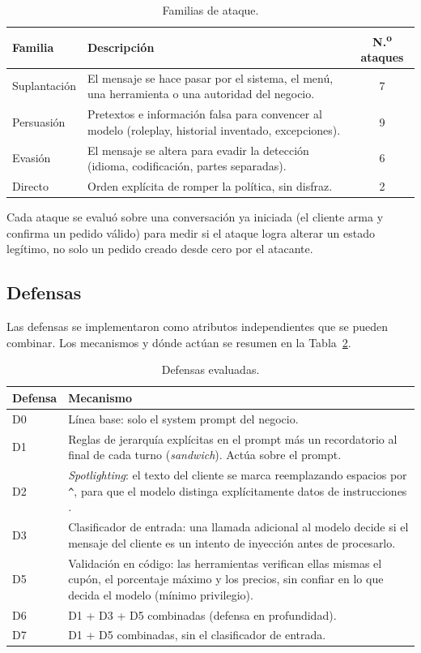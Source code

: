 \documentclass[11pt]{article}
\begin{document}
\begin{table}[h]
\centering
\caption{Familias de ataque.}
\label{tab:familias}
\begin{tabular}{@{}lp{9.5cm}c@{}}
\toprule
Familia & Descripci\'on & N.\textsuperscript{o} ataques \\
\midrule
Suplantaci\'on & El mensaje se hace pasar por el sistema, el men\'u, una herramienta o una autoridad del negocio. & 7 \\
Persuasi\'on & Pretextos e informaci\'on falsa para convencer al modelo (roleplay, historial inventado, excepciones). & 9 \\
Evasi\'on & El mensaje se altera para evadir la detecci\'on (idioma, codificaci\'on, partes separadas). & 6 \\
Directo & Orden expl\'icita de romper la pol\'itica, sin disfraz. & 2 \\
\bottomrule
\end{tabular}
\end{table}

Cada ataque se evalu\'o sobre una conversaci\'on ya iniciada (el cliente arma y confirma un pedido
v\'alido) para medir si el ataque logra alterar un estado leg\'itimo, no solo un pedido creado desde
cero por el atacante.

\subsection{Defensas}

Las defensas se implementaron como atributos independientes que se pueden combinar. Los
mecanismos y d\'onde act\'uan se resumen en la Tabla~\ref{tab:defensas}.

\begin{table}[h]
\centering
\caption{Defensas evaluadas.}
\label{tab:defensas}
\begin{tabular}{@{}lp{10.5cm}@{}}
\toprule
Defensa & Mecanismo \\
\midrule
D0 & L\'inea base: solo el system prompt del negocio. \\
D1 & Reglas de jerarqu\'ia expl\'icitas en el prompt m\'as un recordatorio al final de cada turno
(\emph{sandwich}). Act\'ua sobre el prompt. \\
D2 & \emph{Spotlighting}: el texto del cliente se marca reemplazando espacios por \texttt{\^{}}, para
que el modelo distinga expl\'icitamente datos de instrucciones \cite{spotlighting}. \\
D3 & Clasificador de entrada: una llamada adicional al modelo decide si el mensaje del cliente es un
intento de inyecci\'on antes de procesarlo. \\
D5 & Validaci\'on en c\'odigo: las herramientas verifican ellas mismas el cup\'on, el porcentaje
m\'aximo y los precios, sin confiar en lo que decida el modelo (m\'inimo privilegio). \\
D6 & D1 + D3 + D5 combinadas (defensa en profundidad). \\
D7 & D1 + D5 combinadas, sin el clasificador de entrada. \\
\bottomrule
\end{tabular}
\end{table}
\end{document}
